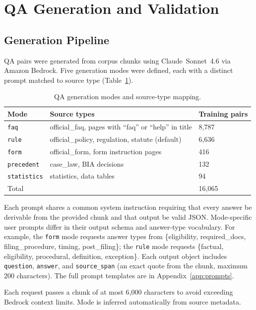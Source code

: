 \documentclass[11pt]{article}
\begin{document}
\section{QA Generation and Validation}
\label{sec:generation}

\subsection{Generation Pipeline}

QA pairs were generated from corpus chunks using Claude~Sonnet~4.6 via Amazon Bedrock. Five generation modes were defined, each with a distinct prompt matched to source type (Table~\ref{tab:modes}).

\begin{table}[ht]
  \centering
  \caption{QA generation modes and source-type mapping.}
  \label{tab:modes}
  \begin{tabular}{lll}
    \toprule
    Mode & Source types & Training pairs \\
    \midrule
    \texttt{faq} & official\_faq, pages with ``faq'' or ``help'' in title & 8,787 \\
    \texttt{rule} & official\_policy, regulation, statute (default) & 6,636 \\
    \texttt{form} & official\_form, form instruction pages & 416 \\
    \texttt{precedent} & case\_law, BIA decisions & 132 \\
    \texttt{statistics} & statistics, data tables & 94 \\
    \midrule
    Total & & 16,065 \\
    \bottomrule
  \end{tabular}
\end{table}

Each prompt shares a common system instruction requiring that every answer be derivable from the provided chunk and that output be valid JSON. Mode-specific user prompts differ in their output schema and answer-type vocabulary. For example, the \texttt{form} mode requests answer types from \{eligibility, required\_docs, filing\_procedure, timing, post\_filing\}; the \texttt{rule} mode requests \{factual, eligibility, procedural, definition, exception\}. Each output object includes \texttt{question}, \texttt{answer}, and \texttt{source\_span} (an exact quote from the chunk, maximum 200 characters). The full prompt templates are in Appendix~\ref{app:prompts}.

Each request passes a chunk of at most 6,000 characters to avoid exceeding Bedrock context limits. Mode is inferred automatically from source metadata.
\end{document}
